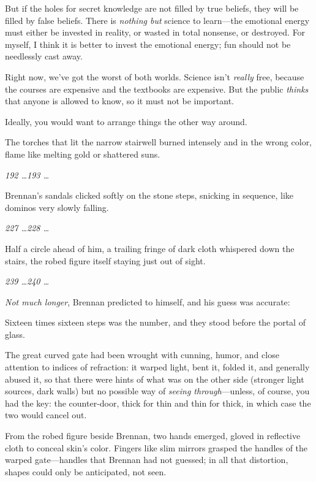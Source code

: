 {
 But if the holes for secret knowledge are not filled by true
beliefs, they will be filled by false beliefs. There is \textit{nothing
but} science to learn---the emotional energy must either be invested in
reality, or wasted in total nonsense, or destroyed. For myself, I think
it is better to invest the emotional energy; fun should not be
needlessly cast away.}

{
 Right now, we've got the worst of both worlds.
Science isn't \textit{really} free, because the courses
are expensive and the textbooks are expensive. But the public
\textit{thinks} that anyone is allowed to know, so it must not be
important.}

{
 Ideally, you would want to arrange things the other way around.}

\myendsectiontext


{
 The torches that lit the narrow stairwell burned intensely and in
the wrong color, flame like melting gold or shattered suns. }

{
 \textit{192 \ldots 193 \ldots}}

{
 Brennan's sandals clicked softly on the stone
steps, snicking in sequence, like dominos very slowly falling.}

{
 \textit{227 \ldots 228 \ldots}}

{
 Half a circle ahead of him, a trailing fringe of dark cloth
whispered down the stairs, the robed figure itself staying just out of
sight.}

{
 \textit{239 \ldots 240 \ldots}}

{
 \textit{Not much longer}, Brennan predicted to himself, and his
guess was accurate:}

{
 Sixteen times sixteen steps was the number, and they stood before
the portal of glass.}

{
 The great curved gate had been wrought with cunning, humor, and
close attention to indices of refraction: it warped light, bent it,
folded it, and generally abused it, so that there were hints of what
was on the other side (stronger light sources, dark walls) but no
possible way of \textit{seeing through}{}---unless, of course, you had
the key: the counter-door, thick for thin and thin for thick, in which
case the two would cancel out.}

{
 From the robed figure beside Brennan, two hands emerged, gloved in
reflective cloth to conceal skin's color. Fingers like
slim mirrors grasped the handles of the warped gate---handles that
Brennan had not guessed; in all that distortion, shapes could only be
anticipated, not seen.}

